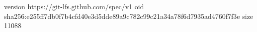 version https://git-lfs.github.com/spec/v1
oid sha256:e255ff7db0f7b4cfd40e3d5dde89a9c782c99c21a34a78f6d7935ad4760f7f3e
size 11088
